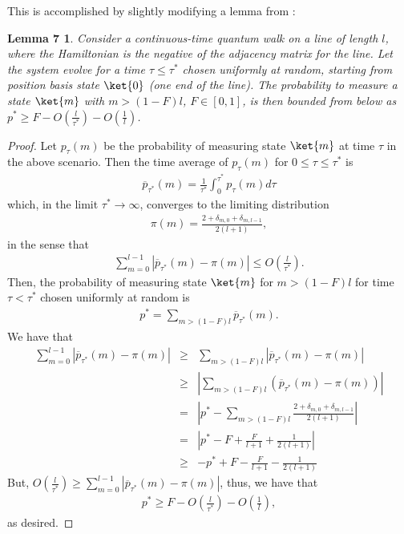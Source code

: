 \documentclass[11pt,letterpaper]{article}
\newtheorem*{lem7}{Lemma 7}
\newcommand{\<}{\langle}
\renewcommand{\>}{\rangle}
\begin{document}
This is accomplished by slightly modifying a lemma from \cite{NW}:
\begin{lem7}
	Consider a continuous-time quantum walk on a line of length $l$, where the Hamiltonian is the negative of the adjacency matrix for the line. Let the system evolve for a time $\tau\leq\tau^*$ chosen uniformly at random, starting from position basis state $\ket{0}$ (one end of the line). The probability to measure a state $\ket{m}$ with $m>(1-F)l$, $F\in[0,1]$, is then bounded from below as $p^*\geq F - O\left(\frac{l}{\tau^*}\right)-O\left(\frac{1}{l}\right)$.
\end{lem7}
\begin{proof}
Let $p_{\tau}(m)$ be the probability of measuring state $\ket{m}$ at time $\tau$ in the above scenario. Then the time average of $p_{\tau}(m)$ for $0\leq\tau\leq\tau^*$ is
\begin{eqnarray}
	\overline{p}_{\tau^*}(m)=\frac{1}{\tau^*}\int_{0}^{\tau^*}p_{\tau}(m)d\tau
\end{eqnarray}
which, in the limit $\tau^*\to\infty$, converges to the limiting distribution \cite{NW}
\begin{eqnarray}
	\pi(m)=\frac{2+\delta_{m,0}+\delta_{m,l-1}}{2(l+1)},
\end{eqnarray}
in the sense that
\begin{eqnarray}
	\sum_{m=0}^{l-1}|\overline{p}_{\tau^*}(m)-\pi(m)|\leq O\left(\frac{l}{\tau^*}\right).
\end{eqnarray}
Then, the probability of measuring state $\ket{m}$ for $m>(1-F)l$ for time $\tau<\tau^*$ chosen uniformly at random is
\begin{eqnarray}
	p^* = \sum_{m>(1-F)l} \overline{p}_{\tau^*}(m).
\end{eqnarray}
We have that
\begin{eqnarray}
	\sum_{m=0}^{l-1}|\overline{p}_{\tau^*}(m)-\pi(m)|&\geq& \sum_{m>(1-F)l}|\overline{p}_{\tau^*}(m)-\pi(m)|
	\\
	&\geq&\left| \sum_{m>(1-F)l}\left(\overline{p}_{\tau^*}(m)-\pi(m)\right) \right|
	\\
	&=&\left| p^* - \sum_{m>(1-F)l} \frac{2+\delta_{m,0}+\delta_{m,l-1}}{2(l+1)} \right|
	\\
	&=&\left| p^* - F+\frac{F}{l+1}+\frac{1}{2(l+1)}\right|
	\\
	&\geq&-p^* + F-\frac{F}{l+1}-\frac{1}{2(l+1)}
\end{eqnarray}
But, $O\left(\frac{l}{\tau^*}\right)\geq\sum_{m=0}^{l-1}|\overline{p}_{\tau^*}(m)-\pi(m)|$, thus, we have that 
\begin{eqnarray}
	p^*\geq F - O\left(\frac{l}{\tau^*}\right)-O\left(\frac{1}{l}\right),
\end{eqnarray}
as desired.
\end{proof}
\end{document}
